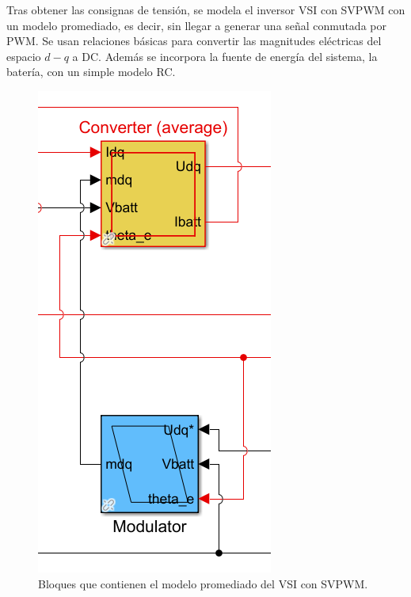 Tras obtener las consignas de tensión, se modela el inversor VSI con SVPWM con un modelo promediado, es decir, sin llegar a generar una señal conmutada por PWM. Se usan relaciones básicas para convertir las magnitudes eléctricas del espacio $d-q$ a DC. Además se incorpora la fuente de energía del sistema, la batería, con un simple modelo RC.

\begin{figure}[H]
    \centering
    \includegraphics[width=0.25\linewidth]{fig/VSIEMR_out.png}
    \caption{Bloques que contienen el modelo promediado del VSI con SVPWM.}

\end{figure}

